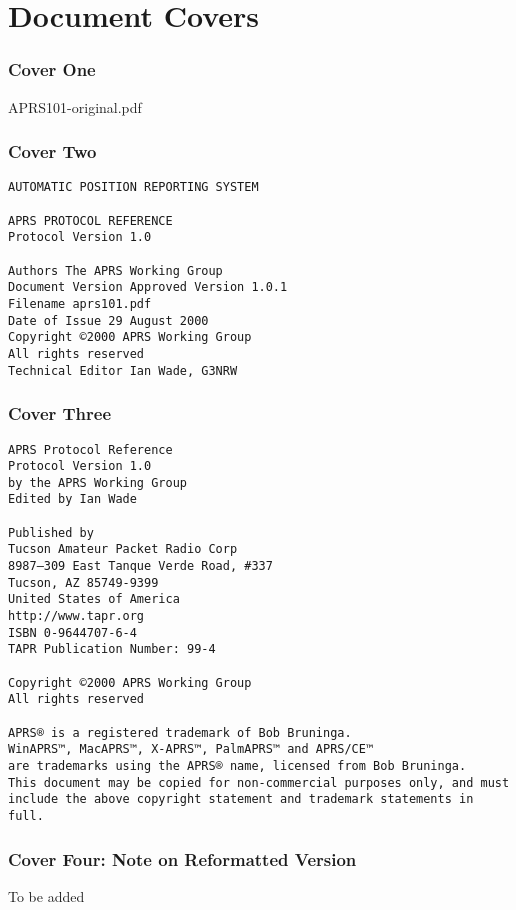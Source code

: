 \part*{Document Covers}

\section*{Cover One}

 {APRS101-original.pdf}

\section*{Cover Two}

\begin{verbatim}
AUTOMATIC POSITION REPORTING SYSTEM

APRS PROTOCOL REFERENCE
Protocol Version 1.0

Authors The APRS Working Group
Document Version Approved Version 1.0.1
Filename aprs101.pdf
Date of Issue 29 August 2000
Copyright ©2000 APRS Working Group
All rights reserved
Technical Editor Ian Wade, G3NRW
\end{verbatim}

\newpage

\section*{Cover Three}

\begin{verbatim}
APRS Protocol Reference
Protocol Version 1.0
by the APRS Working Group
Edited by Ian Wade

Published by
Tucson Amateur Packet Radio Corp
8987–309 East Tanque Verde Road, #337
Tucson, AZ 85749-9399
United States of America
http://www.tapr.org
ISBN 0-9644707-6-4
TAPR Publication Number: 99-4

Copyright ©2000 APRS Working Group
All rights reserved

APRS® is a registered trademark of Bob Bruninga.
WinAPRS™, MacAPRS™, X-APRS™, PalmAPRS™ and APRS/CE™
are trademarks using the APRS® name, licensed from Bob Bruninga.
This document may be copied for non-commercial purposes only, and must
include the above copyright statement and trademark statements in full.
\end{verbatim}

\newpage
\section*{Cover Four: Note on Reformatted Version}
To be added



